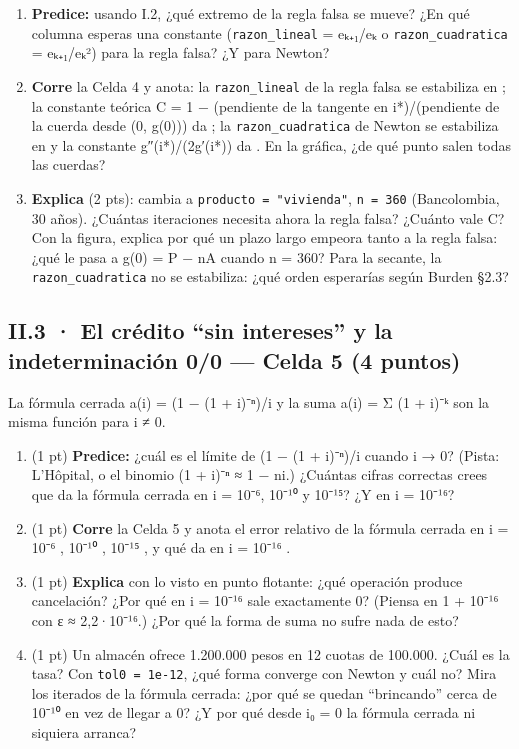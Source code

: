 \begin{enumerate}
\def\labelenumi{\alph{enumi})}
\item
  \textbf{Predice:} usando I.2, ¿qué extremo de la regla falsa se mueve? ¿En qué columna esperas una constante (\texttt{razon\_lineal} = eₖ₊₁/eₖ o \texttt{razon\_cuadratica} = eₖ₊₁/eₖ²) para la regla falsa? ¿Y para Newton?
\item
  \textbf{Corre} la Celda 4 y anota: la \texttt{razon\_lineal} de la regla falsa se estabiliza en  ; la constante teórica C = 1 − (pendiente de la tangente en i*)/(pendiente de la cuerda desde (0, g(0))) da  ; la \texttt{razon\_cuadratica} de Newton se estabiliza en  y la constante \textbar g″(i*)\textbar/(2g′(i*)) da  . En la gráfica, ¿de qué punto salen todas las cuerdas?
\item
  \textbf{Explica} (2 pts): cambia a \texttt{producto\ =\ "vivienda"}, \texttt{n\ =\ 360} (Bancolombia, 30 años). ¿Cuántas iteraciones necesita ahora la regla falsa? ¿Cuánto vale C? Con la figura, explica por qué un plazo largo empeora tanto a la regla falsa: ¿qué le pasa a g(0) = P − nA cuando n = 360? Para la secante, la \texttt{razon\_cuadratica} no se estabiliza: ¿qué orden esperarías según Burden §2.3?
\end{enumerate}

\subsection{II.3 · El crédito ``sin intereses'' y la indeterminación 0/0 --- Celda 5 (4 puntos)}

La fórmula cerrada a(i) = (1 − (1 + i)⁻ⁿ)/i y la suma a(i) = Σ (1 + i)⁻ᵏ son la misma función para i ≠ 0.

\begin{enumerate}
\def\labelenumi{\alph{enumi})}
\item
  (1 pt) \textbf{Predice:} ¿cuál es el límite de (1 − (1 + i)⁻ⁿ)/i cuando i → 0? (Pista: L'Hôpital, o el binomio (1 + i)⁻ⁿ ≈ 1 − ni.) ¿Cuántas cifras correctas crees que da la fórmula cerrada en i = 10⁻⁶, 10⁻¹⁰ y 10⁻¹⁵? ¿Y en i = 10⁻¹⁶?
\item
  (1 pt) \textbf{Corre} la Celda 5 y anota el error relativo de la fórmula cerrada en i = 10⁻⁶  , 10⁻¹⁰  , 10⁻¹⁵  , y qué da en i = 10⁻¹⁶  .
\item
  (1 pt) \textbf{Explica} con lo visto en punto flotante: ¿qué operación produce cancelación? ¿Por qué en i = 10⁻¹⁶ sale exactamente 0? (Piensa en 1 + 10⁻¹⁶ con ε ≈ 2,2·10⁻¹⁶.) ¿Por qué la forma de suma no sufre nada de esto?
\item
  (1 pt) Un almacén ofrece 1.200.000 pesos en 12 cuotas de 100.000. ¿Cuál es la tasa? Con \texttt{tol0\ =\ 1e-12}, ¿qué forma converge con Newton y cuál no? Mira los iterados de la fórmula cerrada: ¿por qué se quedan ``brincando'' cerca de 10⁻¹⁰ en vez de llegar a 0? ¿Y por qué desde i₀ = 0 la fórmula cerrada ni siquiera arranca?
\end{enumerate}

